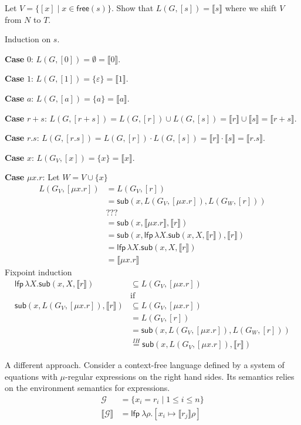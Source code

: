 \documentclass[11pt]{article}
\newcommand\Sem[1]{\llbracket#1\rrbracket}
\newcommand\LFP{\ensuremath{\mathsf{lfp}}}
\newcommand\SUB{\ensuremath{\mathsf{sub}}}
\newcommand\FREE{\ensuremath{\mathsf{free}}}
\begin{document}
Let $V = \{ [x] \mid x \in \FREE (s) \}$.
Show that $L (G, [s]) = \Sem{s}$ where we shift $V$ from $N$ to $T$.

Induction on $s$.

\textbf{Case }$0$: $L (G, [0]) = \emptyset = \Sem{0}$.

\textbf{Case }$1$: $L (G, [1]) = \{\varepsilon \} = \Sem{1}$.

\textbf{Case }$a$: $L (G, [a]) = \{ a \} = \Sem{a}$.

\textbf{Case }$r+s$: $L (G, [r+s]) = L (G, [r]) \cup L (G, [s]) = \Sem{r} \cup \Sem{s} = \Sem{r+s}$.

\textbf{Case }$r.s$: $L (G, [r.s]) = L (G, [r]) \cdot L (G, [s]) = \Sem{r} \cdot \Sem{s} = \Sem{r.s}$.

\textbf{Case }$x$: $L (G_V, [x]) = \{ x \} = \Sem{x}$.

\textbf{Case }$\mu x.r$: Let $W = V \cup \{x\}$
\begin{align*}
  L (G_V, [\mu x.r])
  & = L (G_V, [r])\\
  & = \SUB (x, L (G_V, [\mu x.r]), L (G_W, [r])) \\
  & ??? \\
  &= \SUB(x,\Sem{\mu x.r}, \Sem{r}) \\
  &= \SUB(x, \LFP\, \lambda X. \SUB(x, X, \Sem{r}), \Sem{r}) \\
  &= \LFP\, \lambda X. \SUB(x, X, \Sem{r}) \\
  &=  \Sem{\mu x. r}
\end{align*}
Fixpoint induction
\begin{align*}
  \LFP\, \lambda X. \SUB(x, X, \Sem{r}) &\subseteq   L (G_V, [\mu x.r])\\
                                        & \text{if} \\
  \SUB (x, L (G_V, [\mu x.r]), \Sem{r}) & \subseteq L (G_V, [\mu x.r]) \\
                                        &= L (G_V, [r])\\
                                        & = \SUB (x, L (G_V, [\mu x.r]), L (G_W, [r])) \\
                                        & \stackrel{IH}{=} \SUB (x, L (G_V, [\mu x.r]), \Sem{r})
\end{align*}

\clearpage{}
A different approach. Consider a context-free language defined by a system of equations with $\mu$-regular expressions on the right hand sides. Its semantics relies on the environment semantics for expressions.
\begin{align*}
  \mathcal{G} &= \{ x_i = r_i \mid 1\le i\le n \} \\
  \Sem{\mathcal{G}} &= \LFP\ \lambda \rho. [x_i \mapsto \Sem{r_j}\rho]
\end{align*}
\end{document}
